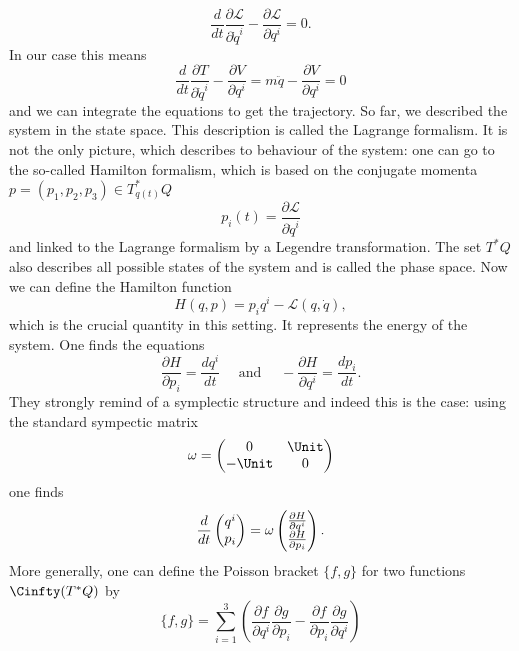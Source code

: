 \begin{equation*}
	\frac{d}{dt} 
	\frac{\partial \mathcal{L}}{\partial \dot q^i}
	-
	\frac{\partial \mathcal{L}}{\partial q^i}
	=
	0.
\end{equation*}
In our case this means
\begin{equation*}
	\frac{d}{dt} 
	\frac{\partial T}{\partial \dot q^i}
	-
	\frac{\partial V}{\partial q^i}
	=
	m \ddot q
	-
	\frac{\partial V}{\partial q^i}
	=
	0
\end{equation*}
and we can integrate the equations to get the trajectory. So far, we described 
the system in the state space. This description is called 
the Lagrange formalism. It is not the only picture, which describes to 
behaviour of the system: one can go to the so-called Hamilton formalism, which 
is based on the conjugate momenta $p = (p_1, p_2, p_3) \in T_{q(t)}^*Q$
\begin{equation*}
	p_i(t)
	=
	\frac{\partial \mathcal{L}}{\partial \dot q^i}
\end{equation*}
and linked to the Lagrange formalism by a Legendre transformation. The set $T^*Q$ 
also describes all possible states of the system and is called the phase space. 
Now we can define the Hamilton function
\begin{equation*}
	H(q, p)
	=
	p_i q^i
	-
	\mathcal{L}(q, \dot q),
\end{equation*} 
which is the crucial quantity in this setting. It represents the energy of the 
system. One finds the equations
\begin{equation*}
	\frac{\partial H}{\partial p_i}
	=
	\frac{d q^i}{dt}
	\quad \text{ and } \quad
	- \frac{\partial H}{\partial q^i}
	=
	\frac{d p_i}{dt}.
\end{equation*}
They strongly remind of a symplectic structure and indeed this is the case: 
using the standard sympectic matrix
\begin{equation*}
	\omega
	=
	\begin{pmatrix}
		0 & \Unit
		\\
		- \Unit & 0
	\end{pmatrix}
\end{equation*}
one finds
\begin{equation*}
	\frac{d}{dt} \begin{pmatrix} q^i \\ p_i \end{pmatrix}
	=
	\omega
	\begin{pmatrix} \frac{\partial H}{\partial q^i} \\ \frac{\partial H}{\partial p_i} \end{pmatrix}.
\end{equation*}
More generally, one can define the Poisson bracket $\{f, g\}$ for two functions 
$\Cinfty(T^*Q)$ by
\begin{equation*}
	\{f, g\}
	=
	\sum\limits_{i=1}^3
	\left(
		\frac{\partial f}{\partial q^i}
		\frac{\partial g}{\partial p_i}
		-
		\frac{\partial f}{\partial p_i}
		\frac{\partial g}{\partial q^i}
	\right)
\end{equation*}
